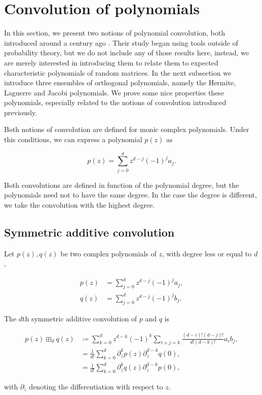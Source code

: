 \section{Convolution of polynomials}

In this section, we present two notions of polynomial convolution, both introduced around a century ago \cite{walsh1922location} \cite{szeg1939orthogonal}. Their study began using tools outside of probability theory, but we do not include any of those results here, instead, we are merely interested in introducing them to relate them to expected characteristic polynomials of random matrices. In the next subsection we introduce three ensembles of orthogonal polynomials, namely the Hermite, Laguerre and Jacobi polynomials. We prove some nice properties these polynomials, especially related to the notions of convolution introduced previously. 

Both notions of convolution are defined for monic complex polynomials. Under this conditions, we can express a polynomial $p(z)$ as

\begin{equation*}
    p(z) = \sum_{j=0}^d z^{d-j}(-1)^{j}a_j.
\end{equation*}

Both convolutions are defined in function of the polynomial degree, but the polynomials need not to have the same degree. In the case the degree is different, we take the convolution with the highest degree. 

\subsection{Symmetric additive convolution}

\begin{definition}\label{def:symadconv}
    Let $p(z), q(z)$ be two complex polynomials of $z$, with degree less or equal to $d$,

    \begin{align*}
        p(z) &= \sum_{j=0}^d z^{d-j}(-1)^{j}a_j,\\
        q(z) &= \sum_{j=0}^d z^{d-j}(-1)^{j}b_j.
    \end{align*}

    The $d$th symmetric additive convolution of $p$ and $q$ is

    \begin{align*}
        p(z) \boxplus_d q(z) &\coloneqq \sum_{k=0}^d z^{d-k}(-1)^k \sum_{i+j = k} \frac{(d-i)!(d-j)!}{d!(d-k)!}a_i b_j, \\
        &= \frac{1}{d!}\sum_{k=0}^d \partial_z^k p(z)\partial_z^{d-k}q(0),\\
        &= \frac{1}{d!}\sum_{k=0}^d \partial_z^k q(z)\partial_z^{d-k}p(0),
    \end{align*}

    \noindent with $\partial_z$ denoting the differentiation with respect to $z$.
\end{definition}

